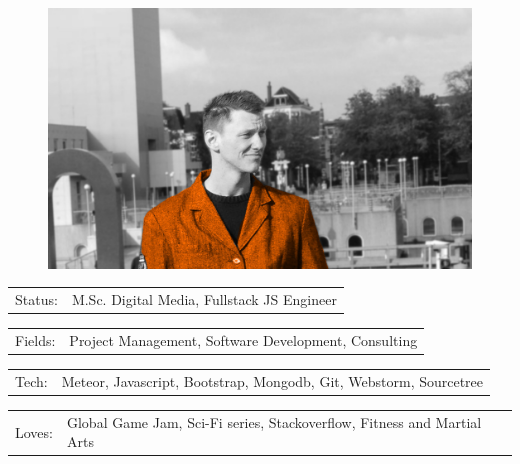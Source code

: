 \documentclass[10pt,A4]{article}
\newcommand{\tzlarrow}{(0,0) -- (0.2,0) -- (0.3,0.2) -- (0.2,0.4) -- (0,0.4) -- (0.1,0.2) -- cycle;}
\newcommand{\larrow}[1]{
	\begin{tikzpicture}[scale=0.58]
		\filldraw[fill=#1!100,draw=#1!100!black] \tzlarrow
	\end{tikzpicture}
}
\newcommand{\metasection}[2]
{
\begin{tabular*}{1\textwidth}{p{2.4cm} p{11cm}}
\larrow{bgcol}	\normalsize{\textcolor{sectcol}{#1}}&#2\\[12pt]
\end{tabular*}
}
\begin{document}
\pagestyle{fancy}	


\vspace{-20.55pt}


\hspace{-0.25\linewidth}\colorbox{bgcol}{}



\begin{figure}[H]
\begin{flushright}
	\includegraphics[trim= 320 130 460 210,clip,width=0.2\linewidth]{myfoto.jpg}	%
\end{flushright}
\end{figure}


\vspace{-114pt}

\metasection{Status:}{M.Sc. Digital Media, Fullstack JS Engineer}
\metasection{Fields:}{Project Management, Software Development, Consulting} 
\metasection{Tech:}{Meteor, Javascript, Bootstrap, Mongodb, Git, Webstorm, Sourcetree}
\metasection{Loves:}{Global Game Jam, Sci-Fi series, Stackoverflow, Fitness and Martial Arts}
\end{document}
